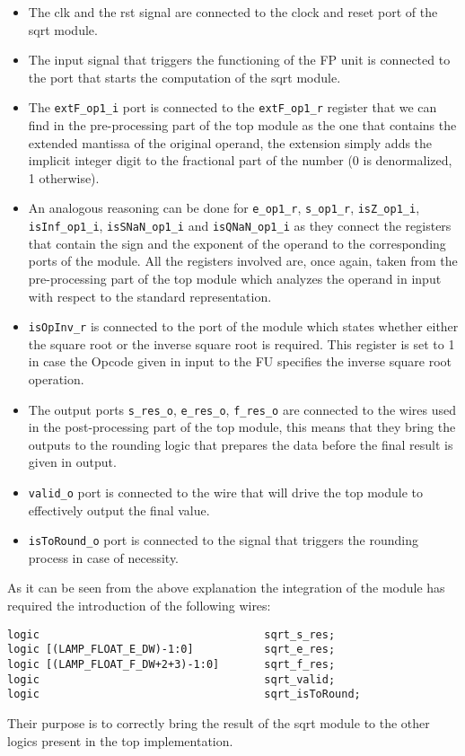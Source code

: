 \documentclass[paper=letter, fontsize=12pt]{article}
\begin{document}
\begin{itemize}
    \item The clk and the rst signal are connected to the clock and reset port of the sqrt module.
    \item The input signal that triggers the functioning of the FP unit is connected to the port that starts the computation of the sqrt module.
    \item The \texttt{extF\_op1\_i} port is connected to the \texttt{extF\_op1\_r} register that we can find in the pre-processing part of the top module as the one that contains the extended mantissa of the original operand, the extension simply adds the implicit integer digit to the fractional part of the number (0 is denormalized, 1 otherwise). 
    \item An analogous reasoning can be done for \texttt{e\_op1\_r}, \texttt{s\_op1\_r}, \texttt{isZ\_op1\_i}, \texttt{isInf\_op1\_i}, \texttt{isSNaN\_op1\_i} and \texttt{isQNaN\_op1\_i} as they connect the registers that contain the sign and the exponent of the operand to the corresponding ports of the module. All the registers involved are, once again, taken from the pre-processing part of the top module which analyzes the operand in input with respect to the standard representation.
    \item \texttt{isOpInv\_r} is connected to the port of the module which states whether either the square root or the inverse square root is required.
    This register is set to 1 in case the Opcode given in input to the FU specifies the inverse square root operation.
    \item The output ports \texttt{s\_res\_o}, \texttt{e\_res\_o}, \texttt{f\_res\_o} are connected to the wires used in the post-processing part of the top module, this means that they bring the outputs to the rounding logic that prepares the data before the final result is given in output.
    \item \texttt{valid\_o} port is connected to the wire that will drive the top module to effectively output the final value.
    \item \texttt{isToRound\_o} port is connected to the signal that triggers the rounding process in case of necessity.
\end{itemize}
As it can be seen from the above explanation the integration of the module has required the introduction of the following wires:
\begin{lstlisting}
logic                                   sqrt_s_res;
logic [(LAMP_FLOAT_E_DW)-1:0]           sqrt_e_res;
logic [(LAMP_FLOAT_F_DW+2+3)-1:0]       sqrt_f_res;
logic                                   sqrt_valid;
logic                                   sqrt_isToRound;
\end{lstlisting}
Their purpose is to correctly bring the result of the sqrt module to the other logics present in the top implementation.
\end{document}
